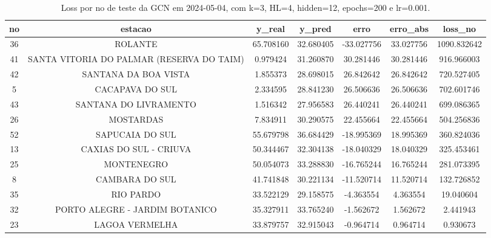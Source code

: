 \begin{table}[h]
\centering
\caption{Loss por no de teste da GCN em 2024-05-04, com k=3, HL=4, hidden=12, epochs=200 e lr=0.001.}
\label{tab:gcn_loss_k3_hl4_h12_e200_d20240504}
\begin{tabular}{ccccccc}
\toprule
no & estacao & y\_real & y\_pred & erro & erro\_abs & loss\_no \\
\midrule
36 & ROLANTE & 65.708160 & 32.680405 & -33.027756 & 33.027756 & 1090.832642 \\
41 & SANTA VITORIA DO PALMAR (RESERVA DO TAIM) & 0.979424 & 31.260870 & 30.281446 & 30.281446 & 916.966003 \\
42 & SANTANA DA BOA VISTA & 1.855373 & 28.698015 & 26.842642 & 26.842642 & 720.527405 \\
5 & CACAPAVA DO SUL & 2.334595 & 28.841230 & 26.506636 & 26.506636 & 702.601746 \\
43 & SANTANA DO LIVRAMENTO & 1.516342 & 27.956583 & 26.440241 & 26.440241 & 699.086365 \\
26 & MOSTARDAS & 7.834911 & 30.290575 & 22.455664 & 22.455664 & 504.256836 \\
52 & SAPUCAIA DO SUL & 55.679798 & 36.684429 & -18.995369 & 18.995369 & 360.824036 \\
13 & CAXIAS DO SUL - CRIUVA & 50.344467 & 32.304138 & -18.040329 & 18.040329 & 325.453461 \\
25 & MONTENEGRO & 50.054073 & 33.288830 & -16.765244 & 16.765244 & 281.073395 \\
8 & CAMBARA DO SUL & 41.741848 & 30.221134 & -11.520714 & 11.520714 & 132.726852 \\
35 & RIO PARDO & 33.522129 & 29.158575 & -4.363554 & 4.363554 & 19.040604 \\
32 & PORTO ALEGRE - JARDIM BOTANICO & 35.327911 & 33.765240 & -1.562672 & 1.562672 & 2.441943 \\
23 & LAGOA VERMELHA & 33.879757 & 32.915043 & -0.964714 & 0.964714 & 0.930673 \\
\bottomrule
\end{tabular}
\end{table}
